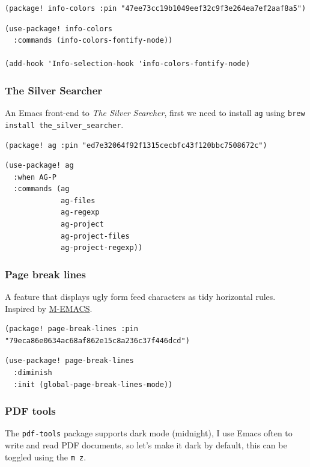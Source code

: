 \documentclass[11pt]{article}
\begin{document}
\begin{verbatim}
(package! info-colors :pin "47ee73cc19b1049eef32c9f3e264ea7ef2aaf8a5")
\end{verbatim}

\begin{verbatim}
(use-package! info-colors
  :commands (info-colors-fontify-node))

(add-hook 'Info-selection-hook 'info-colors-fontify-node)
\end{verbatim}

\subsubsection{The Silver Searcher}
\label{sec:orge5ab11c}
An Emacs front-end to \emph{The Silver Searcher}, first we need to install \texttt{ag} using
\texttt{brew install the\_silver\_searcher}.

\begin{verbatim}
(package! ag :pin "ed7e32064f92f1315cecbfc43f120bbc7508672c")
\end{verbatim}

\begin{verbatim}
(use-package! ag
  :when AG-P
  :commands (ag
             ag-files
             ag-regexp
             ag-project
             ag-project-files
             ag-project-regexp))
\end{verbatim}

\subsubsection{Page break lines}
\label{sec:org5e2ba1d}
A feature that displays ugly form feed characters as tidy horizontal rules.
Inspired by \href{https://github.com/MatthewZMD/.emacs.d\#page-break-lines}{M-EMACS}.

\begin{verbatim}
(package! page-break-lines :pin "79eca86e0634ac68af862e15c8a236c37f446dcd")
\end{verbatim}

\begin{verbatim}
(use-package! page-break-lines
  :diminish
  :init (global-page-break-lines-mode))
\end{verbatim}

\subsubsection{PDF tools}
\label{sec:org9854370}
The \texttt{pdf-tools} package supports dark mode (midnight), I use Emacs often to write
and read PDF documents, so let's make it dark by default, this can be toggled
using the \texttt{m z}.
\end{document}
